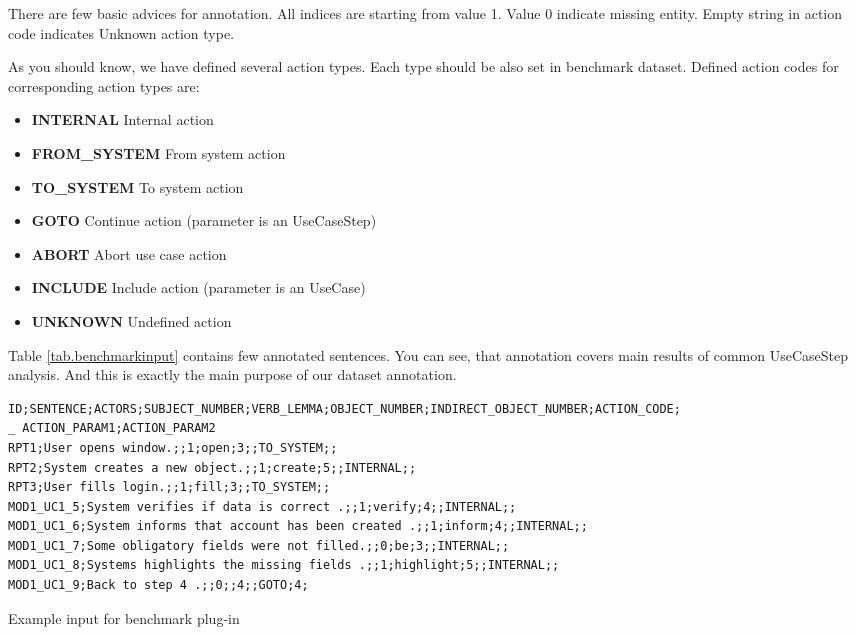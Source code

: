 There are few basic advices for annotation. All indices are starting from value 1. Value 0 indicate missing entity. Empty string in action code indicates Unknown action type. 

As you should know, we have defined several action types. Each type should be also set in benchmark dataset. Defined action codes for corresponding action types are:      
     
\begin{itemize}
\item {\bf INTERNAL} Internal action
\item {\bf FROM\_SYSTEM} From system action
\item {\bf TO\_SYSTEM} To system action
\item {\bf GOTO} Continue action (parameter is an UseCaseStep)
\item {\bf ABORT} Abort use case action
\item {\bf INCLUDE} Include action (parameter is an UseCase)
\item {\bf UNKNOWN} Undefined action
\end{itemize}     

Table \ref{tab.benchmarkinput} contains few annotated sentences. You can see, that annotation covers main results of common UseCaseStep analysis. And this is exactly the main purpose of our dataset annotation.
      
\begin{table}[ht]   %
\begin{center}
    \begin{scriptsize}  
    \begin{verbatim}      
ID;SENTENCE;ACTORS;SUBJECT_NUMBER;VERB_LEMMA;OBJECT_NUMBER;INDIRECT_OBJECT_NUMBER;ACTION_CODE;
_ ACTION_PARAM1;ACTION_PARAM2
RPT1;User opens window.;;1;open;3;;TO_SYSTEM;;
RPT2;System creates a new object.;;1;create;5;;INTERNAL;;
RPT3;User fills login.;;1;fill;3;;TO_SYSTEM;;
MOD1_UC1_5;System verifies if data is correct .;;1;verify;4;;INTERNAL;;
MOD1_UC1_6;System informs that account has been created .;;1;inform;4;;INTERNAL;;
MOD1_UC1_7;Some obligatory fields were not filled.;;0;be;3;;INTERNAL;;
MOD1_UC1_8;Systems highlights the missing fields .;;1;highlight;5;;INTERNAL;;
MOD1_UC1_9;Back to step 4 .;;0;;4;;GOTO;4;
    \end{verbatim}
    \end{scriptsize}
  \caption{Example input for benchmark plug-in}
  \label{tab.benchmarkinput}
\end{center}
\end{table}      
      
